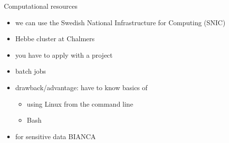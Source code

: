 \documentclass[xcolor=dvipsnames]{beamer}
\begin{document}
\begin{frame}{Computational resources}
\begin{itemize}
  \item we can use the Swedish National Infrastructure for Computing (SNIC) 
  \item Hebbe cluster at Chalmers 
  \item you have to apply with a project
  \item batch jobs
  \item drawback/advantage: have to know basics of
  \begin{itemize}
    \item using Linux from the command line
    \item Bash
  \end{itemize}
  \item for sensitive data BIANCA
\end{itemize}
\end{frame}

\appendix
\end{document}
